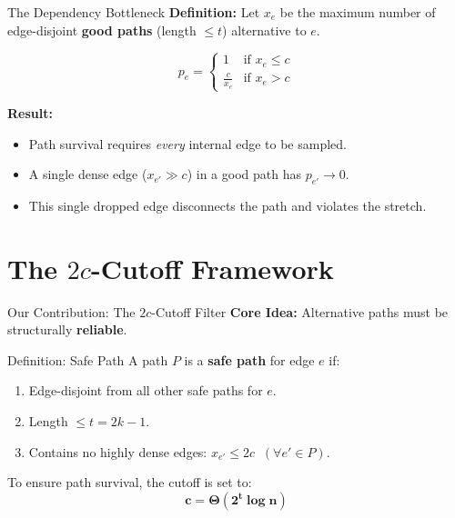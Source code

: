 \documentclass[10pt]{beamer}
\begin{document}
\begin{frame}{The Dependency Bottleneck}
    \textbf{Definition:} Let $x_e$ be the maximum number of edge-disjoint \textbf{good paths} (length $\le t$) alternative to $e$.
    
    \vspace{0.1cm}
    \[
    p_e = 
    \begin{cases} 
        1 & \text{if } x_e \le c \\
        \frac{c}{x_e} & \text{if } x_e > c
    \end{cases}
    \]
    
    \vspace{0.3cm}
    \textbf{Result:}
    \begin{itemize}
        \item Path survival requires \textit{every} internal edge to be sampled.
        \item A single dense edge ($x_{e'} \gg c$) in a good path has $p_{e'} \to 0$.
        \item This single dropped edge disconnects the path and violates the stretch.
    \end{itemize}
\end{frame}

\section{The $2c$-Cutoff Framework}

\begin{frame}{Our Contribution: The $2c$-Cutoff Filter}
    \textbf{Core Idea:} Alternative paths must be structurally \textbf{reliable}.
    
    \vspace{0.3cm}
    \begin{block}{Definition: Safe Path}
        A path $P$ is a \textbf{safe path} for edge $e$ if:
        \begin{enumerate}
            \item Edge-disjoint from all other safe paths for $e$.
            \item Length $\le t = 2k-1$.
            \item Contains no highly dense edges: $x_{e'} \le 2c \;\; (\forall e' \in P)$.
        \end{enumerate}
    \end{block}

    \vspace{0.4cm}
    To ensure path survival, the cutoff is set to:
    \[
\boldsymbol{c = \Theta\!\left(2^t \log n\right)}
\]
\end{frame}
\end{document}
